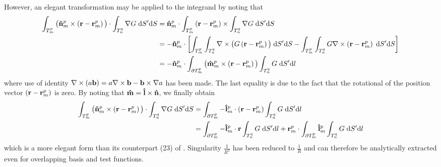 %
\par
However, an elegant transformation may be applied to the integrand by noting that
\begin{equation}
\begin{split}
\int_{T_m^p} \big(\mathbf{\Hat{n}}_m^p \times \left(\mathbf{r}-\mathbf{r}_m^p \right) \big) \cdot \int_{T_n^q} \nabla G \; \text{d} S' \text{d} S &= \mathbf{\Hat{n}}_m^p \cdot \int_{T_m^p} \left(\mathbf{r}-\mathbf{r}_m^p \right) \times \int_{T_n^q} \nabla G \; \text{d} S' \text{d} S \\
&= - \mathbf{\Hat{n}}_m^p \cdot \left[ \int_{T_m^p} \int_{T_n^q} \nabla \times \big( G \left( \mathbf{r}-\mathbf{r}_m^p \right)\big) \; \text{d} S' \text{d} S - \int_{T_m^p} \int_{T_n^q} G \nabla \times \left( \mathbf{r}-\mathbf{r}_m^p \right) \; \text{d} S' \text{d} S\right] \\
&=  - \mathbf{\Hat{n}}_m^p \cdot \int_{\partial T_m^p} \big(\mathbf{\Hat{m}}_m^p \times  \left( \mathbf{r}-\mathbf{r}_m^p \right) \big) \int_{T_n^q}  G \; \text{d} S' \text{d} l 
\end{split}
\end{equation}
where use of identity $\nabla \times \left(a \mathbf{b}\right) = a \nabla \times \mathbf{b} - \mathbf{b} \times \nabla a$ has been made. The last equality is due to the fact that the rotational of the position vector $ \left( \mathbf{r}-\mathbf{r}_m^p \right)$ is zero. By noting that $\mathbf{\Hat{m}} = \mathbf{\Hat{l}} \times \mathbf{\Hat{n}}$, we finally obtain
\begin{equation}
\begin{split}
\int_{T_m^p} \big(\mathbf{\Hat{n}}_m^p  \times \left(\mathbf{r}-\mathbf{r}_m^p \right) \big) \cdot \int_{T_n^q} \nabla G \; \text{d} S' \text{d} S &= \int_{\partial T_m^p} -\mathbf{\Hat{l}}_m^p \cdot  \left( \mathbf{r}-\mathbf{r}_m^p \right)  \int_{T_n^q}  G \; \text{d} S' \text{d} l \\
& = \int_{\partial T_m^p} -\mathbf{\Hat{l}}_m^p \cdot \mathbf{r}  \int_{T_n^q}  G \; \text{d} S' \text{d} l + \mathbf{r}_m^p \cdot \int_{\partial T_m^p}\mathbf{\Hat{l}}_m^p  \int_{T_n^q}  G \; \text{d} S' \text{d} l
\end{split}
\end{equation}
which is a more elegant form than its counterpart (23) of \cite{Taskinen_03}. Singularity $\frac{1}{R^2}$ has been reduced to $\frac{1}{R}$ and can therefore be analytically extracted even for overlapping basis and test functions. 

